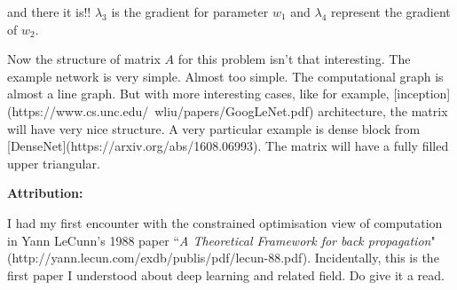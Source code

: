 \documentclass[12pt,crop=false,class=article,convert={density=300,outext=.compiled.png}]{standalone}
\begin{document}
and there it is!! $\lambda_3$ is the gradient for parameter $w_1$ and $\lambda_4$ represent the gradient of $w_2$.

Now the structure of matrix $A$ for this problem isn't that interesting.
The example network is very simple. Almost too simple. The computational
graph is almost a line graph. But with more interesting cases, like for
example, [inception](https://www.cs.unc.edu/~wliu/papers/GoogLeNet.pdf)
architecture, the matrix will have very nice structure. A very
particular example is dense block from
[DenseNet](https://arxiv.org/abs/1608.06993). The matrix will have a
fully filled upper triangular.

\textbf{Attribution:} \par{} I had my first encounter with the constrained
optimisation view of computation in Yann LeCunn's 1988
paper ``\emph{A Theoretical Framework for back propagation}" \\(http://yann.lecun.com/exdb/publis/pdf/lecun-88.pdf). Incidentally, this is the
first paper I understood about deep learning and related field. Do give
it a read.
\end{document}
